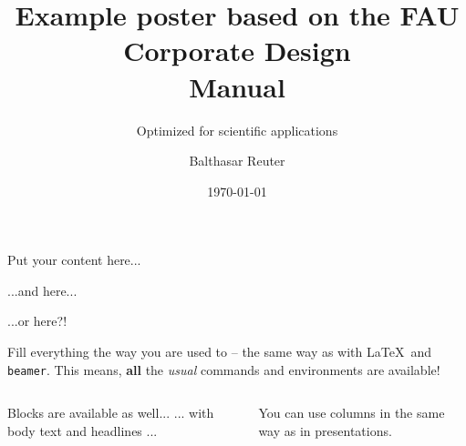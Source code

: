 \documentclass[final]{beamer} %
\title{Example poster based on the FAU Corporate Design\\Manual}
\subtitle{Optimized for scientific applications}
\author{Balthasar Reuter}
\institute{Applied Mathematics I, Friedrich-Alexander-University Erlangen-N\"urnberg}
\date{\today}
\begin{document}
\begin{frame}{\inserttitle}{\insertsubtitle}
%

  \begin{center}
    \LARGE Put your content here...
  \end{center}

  \vfill

  \begin{flushleft}
    \large ...and here...
  \end{flushleft}

  \vfill

  \begin{flushright}
    \Large ...or here?!
  \end{flushright}


  \vfill

  Fill everything the way you are used to -- the same way as with \LaTeX~and \texttt{beamer}.
  This means, \textbf{all} the \emph{usual} commands and environments are available!

  \vfill

  \begin{columns}[c]
    \hfill
    \begin{column}{.45\textwidth}
      \begin{block}{Blocks are available as well...}
        ... with body text and headlines ...
      \end{block}
    \end{column}
    \begin{column}{.45\textwidth}
      You can use columns in the same way as in presentations.
    \end{column}
  \end{columns}

\end{frame}
\end{document}
